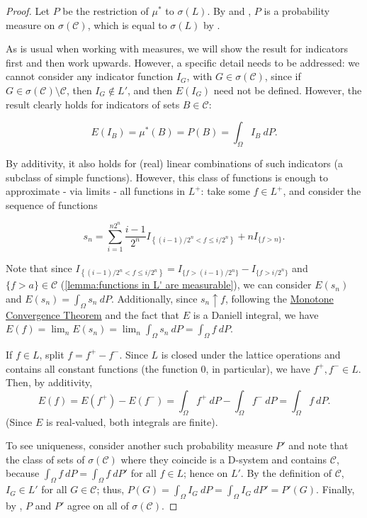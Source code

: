 \begin{proof}
		Let \(P\) be the restriction of \(\mu^*\) to \(\sigma(L)\). By  and , \(P\) is a probability measure on \(\sigma(\mathcal{C})\), which is equal to \(\sigma(L)\) by .
		
		As is usual when working with measures, we will show the result for indicators first and then work upwards. However, a specific detail needs to be addressed: we cannot consider any indicator function \(I_G\), with \(G\in\sigma(\mathcal{C})\), since if \(G\in\sigma(\mathcal{C})\setminus \mathcal{C}\), then \(I_G\not\in L'\), and then \(E(I_G)\) need not be defined. However, the result clearly holds for indicators of sets \(B\in\mathcal{C}\):

		\[
			E(I_B)=\mu^*(B)=P(B)=\int_{\Omega}I_B~dP
		.\]
		
		By additivity, it also holds for (real) linear combinations of such indicators (a subclass of simple functions). However, this class of functions is enough to approximate - via limits - all functions in \(L^+\): take some \(f\in L^+\), and consider the sequence of functions

		\[
			s_n=\sum_{i=1}^{n2^n}\frac{i-1}{2^n}I_{\left\{(i-1)/2^n<f\leq i/2^n\right\}}+nI_{\{f>n\}}
		.\]
		
		Note that since \(I_{\left\{(i-1)/2^n<f\leq i/2^n\right\}}=I_{\{f>(i-1)/2^n\}}-I_{\{f>i/2^n\}}\) and \(\{f>a\}\in \mathcal{C}\) (\cref{lemma:functions in L' are measurable}), we can consider \(E(s_n)\) and \(E(s_n)=\int_{\Omega}s_n~dP\). Additionally, since \(s_n \uparrow f\), following the \hyperref[theorem:Monotone Convergence]{Monotone Convergence Theorem} and the fact that \(E\) is a Daniell integral, we have \(E(f)=\lim_nE(s_n)=\lim_n\int_{\Omega}s_n~dP=\int_{\Omega}f~dP\).

		If \(f\in L\), split \(f=f^{+}-f^{-}\). Since \(L\) is closed under the lattice operations and contains all constant functions (the function \(0\), in particular), we have \(f^{+},f^{-}\in L\). Then, by additivity,
		\[
				E(f)=E(f^{+})-E(f^{-})=\int_{\Omega}f^{+}~dP-\int_{\Omega}f^{-}~dP=\int_{\Omega}f~dP
		.\]
		(Since \(E\) is real-valued, both integrals are finite).

		To see uniqueness, consider another such probability measure \(P'\) and note that the class of sets of \(\sigma(\mathcal{C})\) where they coincide is a D-system and contains \(\mathcal{C}\), because \(\int_{\Omega}f~dP=\int_{\Omega}f~dP'\) for all \(f\in L\); hence on \(L'\). By the definition of \(\mathcal{C}\), \(I_G\in L'\) for all \(G\in\mathcal{C}\); thus, \(P(G)=\int_{\Omega}I_G~dP=\int_{\Omega}I_G~dP'=P'(G)\). Finally, by , \(P\) and \(P'\) agree on all of \(\sigma(\mathcal{C})\).
\end{proof}
